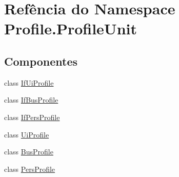 \hypertarget{namespaceProfile_1_1ProfileUnit}{\section{Refência do Namespace Profile.\-Profile\-Unit}
\label{d0/d31/namespaceProfile_1_1ProfileUnit}
}
\subsection*{Componentes}
\begin{DoxyCompactItemize}
\item 
class \hyperlink{classProfile_1_1ProfileUnit_1_1IfUiProfile}{If\-Ui\-Profile}
\item 
class \hyperlink{classProfile_1_1ProfileUnit_1_1IfBusProfile}{If\-Bus\-Profile}
\item 
class \hyperlink{classProfile_1_1ProfileUnit_1_1IfPersProfile}{If\-Pers\-Profile}
\item 
class \hyperlink{classProfile_1_1ProfileUnit_1_1UiProfile}{Ui\-Profile}
\item 
class \hyperlink{classProfile_1_1ProfileUnit_1_1BusProfile}{Bus\-Profile}
\item 
class \hyperlink{classProfile_1_1ProfileUnit_1_1PersProfile}{Pers\-Profile}
\end{DoxyCompactItemize}
